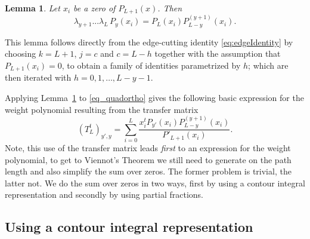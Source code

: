 \documentclass[11pt,a4paper]{article}
\newtheorem{lemma}{Lemma}[section]
\newcommand{\la}{\lambda}
\begin{document}
%
\begin{lemma} 
	\label{lem:nontrivialPavingPolyIdentity} 
	Let $x_i$ be a zero of  $P_{L+1}(x)$.  Then
\begin{equation}
		\la_{y+1}...\la_L\,	P_y(x_i)
			=  P_L(x_i) P^{(y+1)}_{L-y}(x_i).
\end{equation}
\end{lemma} 
%
This lemma follows directly from the edge-cutting identity  \eqref{eq:edgeIdentity} by choosing $k=L+1$, $j=c$ and $c=L-h$ together with the assumption that  $P_{L+1}(x_i)=0$, to obtain a family of identities parametrized by $h$; which are then iterated with $h=0,1,\dots,L-y-1$.


Applying Lemma~\ref{lem:nontrivialPavingPolyIdentity}  to \eqref{eq_quadortho} gives the following basic expression for the weight polynomial resulting from the transfer matrix
\begin{equation}\label{eq:evexpand}
(T_L^t)_{y',y} =\sum_{i=0}^L \frac{x_i^t P_{y'}(x_i) P^{(y+1)}_{L-y}(x_i) }{P'_{L+1}(x_i)}. 
\end{equation}
Note, this use of the transfer matrix leads \emph{first} to an expression for the weight polynomial,
to get to Viennot's Theorem we still need to generate on the path length and also simplify the sum over zeros. The former problem is trivial, the latter not. We do the sum over zeros in two ways, first by using a contour integral representation and secondly by using partial fractions.

\subsection*{Using a contour integral representation}
\end{document}
